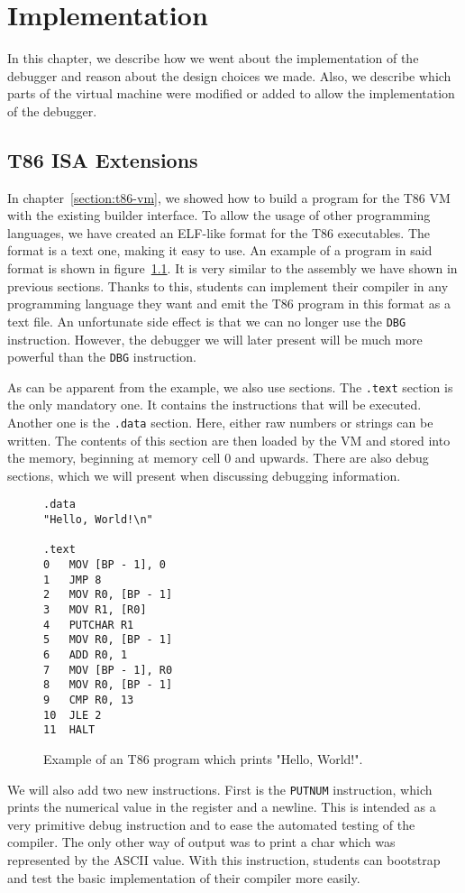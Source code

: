 \chapter{Implementation}
In this chapter, we describe how we went about the implementation of the
debugger and reason about the design choices we made. Also, we describe which
parts of the virtual machine were modified or added to allow the implementation
of the debugger.

\section{T86 ISA Extensions}\label{section:parser}
In chapter~\ref{section:t86-vm}, we showed how to build a program for the T86
VM with the existing builder interface. To allow the usage of other programming
languages, we have created an ELF-like format for the T86 executables. The
format is a text one, making it easy to use. An example of a program in said
format is shown in figure~\ref{fig:t86-program}. It is very similar to the
assembly we have shown in previous sections. Thanks to this, students can
implement their compiler in any programming language they want and emit the T86
program in this format as a text file. An unfortunate side effect is that we
can no longer use the \texttt{DBG} instruction. However, the debugger we will
later present will be much more powerful than the \texttt{DBG} instruction.

As can be apparent from the example, we also use sections. The \texttt{.text}
section is the only mandatory one. It contains the instructions that will be
executed. Another one is the \texttt{.data} section. Here, either raw numbers
or strings can be written. The contents of this section are then loaded by the
VM and stored into the memory, beginning at memory cell 0 and upwards. There
are also debug sections, which we will present when discussing debugging
information.

\begin{figure}
    \begin{lstlisting}
.data
"Hello, World!\n"

.text
0   MOV [BP - 1], 0
1   JMP 8
2   MOV R0, [BP - 1]
3   MOV R1, [R0]
4   PUTCHAR R1
5   MOV R0, [BP - 1]
6   ADD R0, 1
7   MOV [BP - 1], R0
8   MOV R0, [BP - 1]
9   CMP R0, 13
10  JLE 2
11  HALT
    \end{lstlisting}
    \caption{Example of an T86 program which prints "Hello, World!".}
    \label{fig:t86-program}
\end{figure}
We will also add two new instructions. First is the \texttt{PUTNUM}
instruction, which prints the numerical value in the register and a newline.
This is intended as a very primitive debug instruction and to ease the
automated testing of the compiler. The only other way of output was to print a
char which was represented by the ASCII value. With this instruction, students
can bootstrap and test the basic implementation of their compiler more easily.

